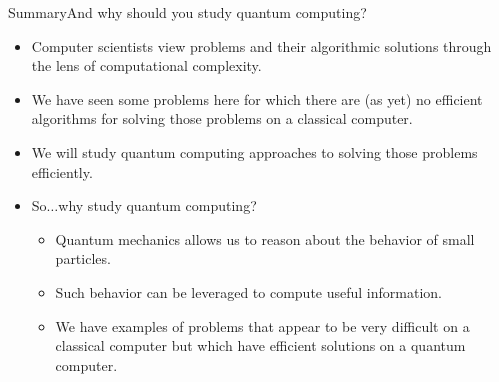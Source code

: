 \begin{frame}{Summary}{And why should you study quantum computing?}

\begin{itemize}
    \item Computer scientists view problems and their algorithmic solutions through the lens of computational complexity.
    \item We have seen some problems here for which there are (as yet) no efficient algorithms for solving those problems on a classical computer.
    \item We will study quantum computing approaches to solving those problems efficiently.
    \item So$\ldots$why study quantum computing?
    \begin{itemize}
        \item Quantum mechanics allows us to reason about the behavior of small particles.
        \item Such behavior can be leveraged to compute useful information.
        \item We have examples of problems that appear to be very difficult on a classical computer but which have efficient solutions on a quantum computer.
    \end{itemize}
\end{itemize}

    
\end{frame}
